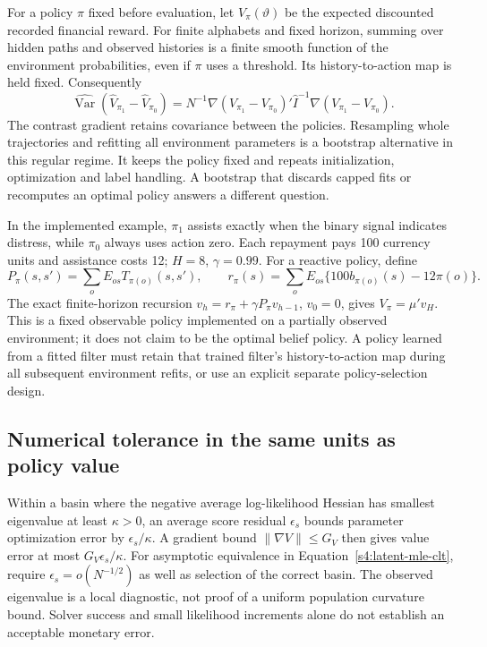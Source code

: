 For a policy $\pi$ fixed before evaluation, let $V_\pi(\vartheta)$ be
the expected discounted recorded financial reward. For finite alphabets
and fixed horizon, summing over hidden paths and observed histories is a
finite smooth function of the environment probabilities, even if $\pi$
uses a threshold. Its history-to-action map is held fixed. Consequently
\[
 \widehat{\operatorname{Var}}(\widehat V_{\pi_1}-\widehat V_{\pi_0})
 =N^{-1}\nabla(V_{\pi_1}-V_{\pi_0})'
       \widehat I^{-1}\nabla(V_{\pi_1}-V_{\pi_0}).
\]
The contrast gradient retains covariance between the policies. Resampling
whole trajectories and refitting all environment parameters is a bootstrap
alternative in this regular regime. It keeps the policy fixed and repeats
initialization, optimization and label handling. A bootstrap that discards
capped fits or recomputes an optimal policy answers a different question.

In the implemented example, $\pi_1$ assists exactly when the binary signal
indicates distress, while $\pi_0$ always uses action zero. Each repayment
pays 100 currency units and assistance costs 12; $H=8$, $\gamma=0.99$.
For a reactive policy, define
\[
 P_\pi(s,s')=\sum_o E_{os}T_{\pi(o)}(s,s'),\qquad
 r_\pi(s)=\sum_o E_{os}\{100b_{\pi(o)}(s)-12\pi(o)\}.
\]
The exact finite-horizon recursion $v_h=r_\pi+\gamma P_\pi v_{h-1}$,
$v_0=0$, gives $V_\pi=\mu'v_H$. This is a fixed observable policy
implemented on a partially observed environment; it does not claim to
be the optimal belief policy. A policy learned from a fitted filter must
retain that trained filter's history-to-action map during all subsequent
environment refits, or use an explicit separate policy-selection design.

\subsection{Numerical tolerance in the same units as policy value}
Within a basin where the negative average log-likelihood Hessian has
smallest eigenvalue at least $\kappa>0$, an average score residual
$\epsilon_s$ bounds parameter optimization error by
$\epsilon_s/\kappa$. A gradient bound $\|\nabla V\|\le G_V$ then
gives value error at most $G_V\epsilon_s/\kappa$. For asymptotic equivalence
in Equation~\eqref{s4:latent-mle-clt}, require
$\epsilon_s=o(N^{-1/2})$ as well as selection of the correct basin.
The observed eigenvalue is a local diagnostic, not proof of a uniform
population curvature bound. Solver success and small likelihood increments
alone do not establish an acceptable monetary error.


